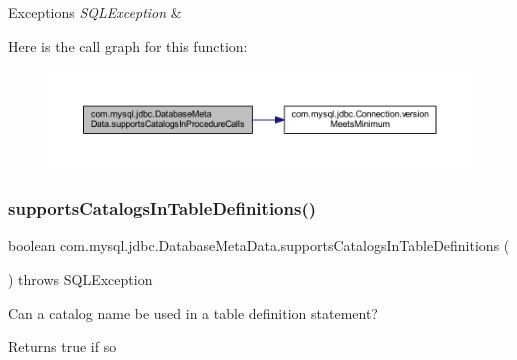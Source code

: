 \begin{DoxyExceptions}{Exceptions}
{\em S\+Q\+L\+Exception} & \\
\hline
\end{DoxyExceptions}
Here is the call graph for this function\+:
\nopagebreak
\begin{figure}[H]
\begin{center}
\leavevmode
\includegraphics[width=350pt]{classcom_1_1mysql_1_1jdbc_1_1_database_meta_data_a709d1b7e39661466b4742e85e40823d9_cgraph}
\end{center}
\end{figure}
\mbox{\label{classcom_1_1mysql_1_1jdbc_1_1_database_meta_data_ad1931a1639f961d1267157b1ec54e8a3}} 
\subsubsection{\texorpdfstring{supports\+Catalogs\+In\+Table\+Definitions()}{supportsCatalogsInTableDefinitions()}}
{\footnotesize\ttfamily boolean com.\+mysql.\+jdbc.\+Database\+Meta\+Data.\+supports\+Catalogs\+In\+Table\+Definitions (\begin{DoxyParamCaption}{ }\end{DoxyParamCaption}) throws S\+Q\+L\+Exception}

Can a catalog name be used in a table definition statement?

\begin{DoxyReturn}{Returns}
true if so 
\end{DoxyReturn}

